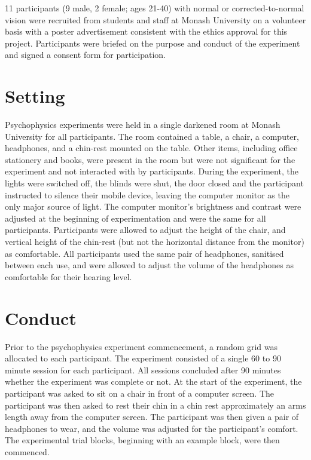 \documentclass[a4paper,11pt,openany]{book}
\begin{document}
11 participants (9 male, 2 female; ages 21-40) with normal or corrected-to-normal vision were recruited from students and staff at Monash University on a volunteer basis with a poster advertisement consistent with the ethics approval for this project.
Participants were briefed on the purpose and conduct of the experiment and signed a consent form for participation.

\section*{Setting}
\label{sec:orgeb88a0a}

Psychophysics experiments were held in a single darkened room at Monash University for all participants.
The room contained a table, a chair, a computer, headphones, and a chin-rest mounted on the table.
Other items, including office stationery and books, were present in the room but were not significant for the experiment and not interacted with by participants.
During the experiment, the lights were switched off, the blinds were shut, the door closed and the participant instructed to silence their mobile device, leaving the computer monitor as the only major source of light.
The computer monitor's brightness and contrast were adjusted at the beginning of experimentation and were the same for all participants.
Participants were allowed to adjust the height of the chair, and vertical height of the chin-rest (but not the horizontal distance from the monitor) as comfortable.
All participants used the same pair of headphones, sanitised between each use, and were allowed to adjust the volume of the headphones as comfortable for their hearing level.

\section*{Conduct}
\label{sec:orgb68eb8b}

Prior to the psychophysics experiment commencement, a random grid was allocated to each participant.
The experiment consisted of a single 60 to 90 minute session for each participant.
All sessions concluded after 90 minutes whether the experiment was complete or not.
At the start of the experiment, the participant was asked to sit on a chair in front of a computer screen.
The participant was then asked to rest their chin in a chin rest approximately an arms length away from the computer screen.
The participant was then given a pair of headphones to wear, and the volume was adjusted for the participant's comfort.
The experimental trial blocks, beginning with an example block, were then commenced.
\end{document}
